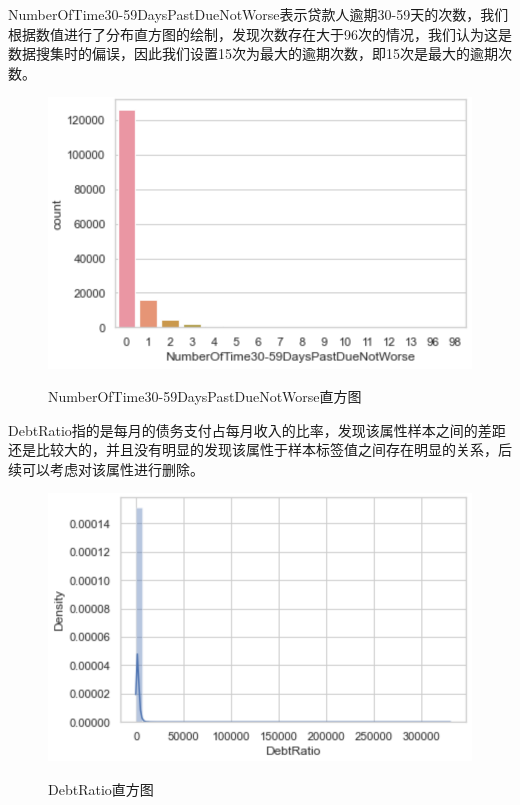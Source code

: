 \documentclass{zjureport}
\begin{document}
\begin{clause}
    \item NumberOfTime30-59DaysPastDueNotWorse表示贷款人逾期30-59天的次数，我们根据数值进行了分布直方图的绘制，发现次数存在大于96次的情况，我们认为这是数据搜集时的偏误，因此我们设置15次为最大的逾期次数，即15次是最大的逾期次数。
    \begin{figure}[H]
    \centering
    \includegraphics[scale=0.6]{figures/image6.png}\\
    \caption{NumberOfTime30-59DaysPastDueNotWorse直方图}
    \end{figure}
     \item DebtRatio指的是每月的债务支付占每月收入的比率，发现该属性样本之间的差距还是比较大的，并且没有明显的发现该属性于样本标签值之间存在明显的关系，后续可以考虑对该属性进行删除。
    \begin{figure}[H]
    \centering
    \includegraphics[scale=0.7]{figures/image7.png}\\
    \caption{DebtRatio直方图}
    \end{figure}
      

\end{clause}
\end{document}
